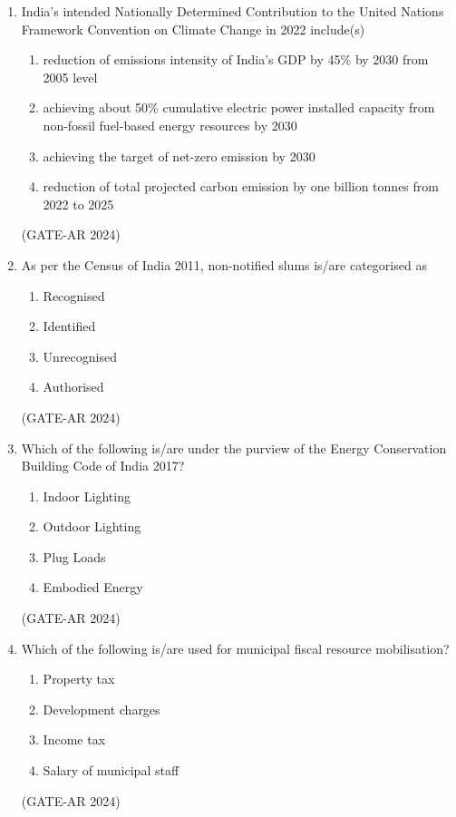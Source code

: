\documentclass[a4paper,10pt]{article}
\begin{document}
\begin{enumerate}
    \item India's intended Nationally Determined Contribution to the United Nations Framework Convention on Climate Change in 2022 include(s)
    \begin{enumerate}
        \item reduction of emissions intensity of India's GDP by 45\% by 2030 from 2005 level
        \item achieving about 50\% cumulative electric power installed capacity from non-fossil fuel-based energy resources by 2030
        \item achieving the target of net-zero emission by 2030
        \item reduction of total projected carbon emission by one billion tonnes from 2022 to 2025
    \end{enumerate}
    \hfill (GATE-AR 2024)

    \item As per the Census of India 2011, non-notified slums is/are categorised as
    \begin{multicols}{4}
    \begin{enumerate}
        \item Recognised
        \item Identified
        \item Unrecognised
        \item Authorised
    \end{enumerate}
    \end{multicols}
    \hfill (GATE-AR 2024)

    \item Which of the following is/are under the purview of the Energy Conservation Building Code of India 2017?
    \begin{multicols}{2}
    \begin{enumerate}
        \item Indoor Lighting
        \item Outdoor Lighting
        \item Plug Loads
        \item Embodied Energy
    \end{enumerate}
    \end{multicols}
    \hfill (GATE-AR 2024)

    \item Which of the following is/are used for municipal fiscal resource mobilisation?
    \begin{multicols}{2}
    \begin{enumerate}
        \item Property tax
        \item Development charges
        \item Income tax
        \item Salary of municipal staff
    \end{enumerate}
    \end{multicols}
    \hfill (GATE-AR 2024)


\end{enumerate}
\end{document}
